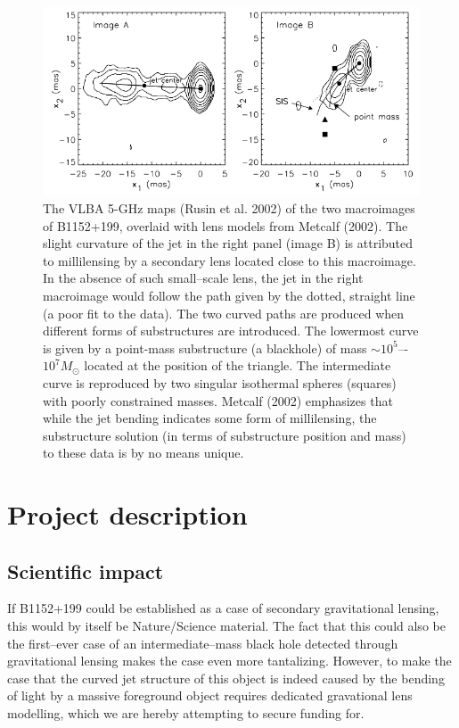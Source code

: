 \documentclass[a4paper, 11pt]{article}
\begin{document}
\begin{figure}[tbh]
\centering
\includegraphics[scale=0.75]{Figure-2002.jpg}
\caption{The VLBA 5-GHz maps (Rusin et al. 2002) of the two macroimages of B1152+199, overlaid with lens models from Metcalf (2002). The slight curvature of the jet in the right panel (image B) is attributed to millilensing by a secondary lens located close to this macroimage. In the absence of such small--scale lens, the jet in the right macroimage would follow the path given by the dotted, straight line (a poor fit to the data). The two curved paths are produced when different forms of substructures are introduced. The lowermost curve is given by a point-mass substructure (a blackhole) of mass $\sim 10^5$–-$10^7 M_\odot$ located at the position of the triangle. The intermediate curve is reproduced by two singular isothermal spheres (squares) with poorly constrained masses. Metcalf (2002) emphasizes that while the jet bending indicates some form of millilensing, the substructure solution (in terms of substructure position and mass) to these data is by no means unique.}
\end{figure}


\section{Project description}

\subsection{Scientific impact}
If B1152+199 could be established as a case of secondary gravitational lensing, this would by itself be Nature/Science material. The fact that this could also be the first--ever case of an intermediate--mass black hole detected through gravitational lensing makes the case even more tantalizing. However, to make the case that the curved jet structure of this object is indeed caused by the bending of light by a massive foreground object requires dedicated gravational lens modelling, which we are hereby attempting to secure funding for.
\end{document}
